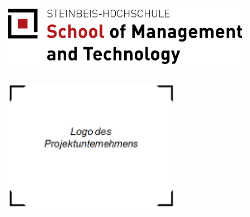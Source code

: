 \hypersetup{pageanchor=false}
\begin{titlepage}
\begin{figure}[htbp]
  \begin{minipage}[t][2cm][c]{\textwidth/2+1.7cm}
	
		\includegraphics[height=4em]{_includes/images/scmt-logo.png}  

  \end{minipage}
  \begin{minipage}[t][3cm][c]{\textwidth/2-1.7cm}
	\begin{flushright}
	\end{flushright}
  \end{minipage}
\end{figure}



\vspace{3em}
\begin{center}
	\large{\textsf{\IUMStype}}
\end{center}

\vspace{2em}
\begin{figure}[htbp]
\centering
\includegraphics[height=9em]{_includes/images/some-company-logo.png}
\end{figure}

\begin{center}
\vspace{2em}
\Huge{\textbf{\textsf{\IUMStitle}}}


\large{\emph{\textsf{\IUMSsubtitle\SCMTstudyprogramlarge}}}
\vspace{\fill}
\end{center}


\end{titlepage}
